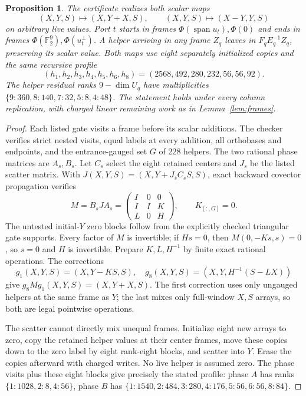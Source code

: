 \documentclass[11pt]{amsart}
\newtheorem{proposition}[theorem]{Proposition}
\theoremstyle{remark}
\newcommand{\F}{\mathbb F_2}
\newcommand{\Span}{\operatorname{span}}
\begin{document}
\begin{proposition}\label{prop:provider}
The certificate realizes both scalar maps
\[
 (X,Y,S)\mapsto(X,Y+X,S),\qquad
 (X,Y,S)\mapsto(X-Y,Y,S)
\]
on arbitrary live values. Port $t$ starts in frames
$\Phi(\Span u_t),\Phi(0)$ and ends in frames
$\Phi(\F^9),\Phi(u_t^\perp)$. A helper arriving in any frame $Z_q$
leaves in $F_qE_q^{-1}Z_q$, preserving its scalar value. Both maps
use eight separately initialized copies and the same recursive profile
\[
 (h_1,h_2,h_3,h_4,h_5,h_6,h_8)
 =(2568,492,280,232,56,56,92).
\]
The helper residual ranks $9-\dim U_q$ have multiplicities
$\{9:360,8:140,7:32,5:8,4:48\}$. The statement holds under every
column replication, with charged linear remaining work as in
Lemma~\ref{lem:frames}.
\end{proposition}
\begin{proof}
Each listed gate visits a frame before its scalar additions. The checker
verifies strict nested visits, equal labels at every addition, all
orthobases and endpoints, and the entrance-gauged set $G$ of 228 helpers.
The two rational phase matrices are $A_s,B_s$. Let $C_s$ select the
eight retained centers and $J_s$ be the listed scatter matrix. With
$J(X,Y,S)=(X,Y+J_sC_sS,S)$, exact backward covector propagation verifies
\begin{equation}\label{eq:scalar}
 M=B_sJA_s=
 \begin{pmatrix}I&0&0\\I&I&K\\L&0&H\end{pmatrix},\qquad K_{[:,G]}=0.
\end{equation}
The untested initial-$Y$ zero blocks follow from the explicitly checked
triangular gate supports. Every factor of $M$ is invertible; if $Hs=0$,
then $M(0,-Ks,s)=0$, so $s=0$ and $H$ is invertible. Prepare $K,L,H^{-1}$
by finite exact rational operations. The corrections
\[
 g_1(X,Y,S)=(X,Y-KS,S),\quad
 g_8(X,Y,S)=(X,Y,H^{-1}(S-LX))
\]
give $g_8Mg_1(X,Y,S)=(X,Y+X,S)$. The first correction uses only
ungauged helpers at the same frame as $Y$; the last mixes only
full-window $X,S$ arrays, so both are legal pointwise operations.

The scatter cannot directly mix unequal frames. Initialize eight new
arrays to zero, copy the retained helper values at their center frames,
move these copies down to the zero label by eight rank-eight blocks,
and scatter into $Y$. Erase the copies afterward with charged writes.
No live helper is assumed zero. The phase visits plus these eight
blocks give precisely the stated profile: phase $A$ has ranks
$\{1:1028,2:8,4:56\}$, phase $B$ has
$\{1:1540,2:484,3:280,4:176,5:56,6:56,8:84\}$.


\end{proof}
\end{document}
